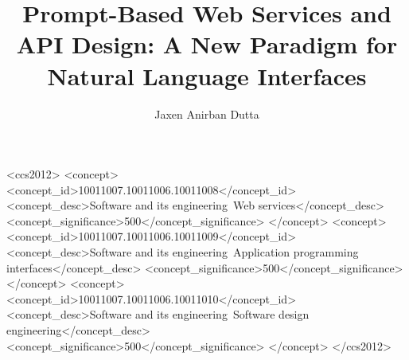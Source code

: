 \documentclass[sigplan,screen]{acmart}
\begin{document}
\title{Prompt-Based Web Services and API Design: A New Paradigm for Natural Language Interfaces}

\author{Jaxen Anirban Dutta}

\renewcommand{\shortauthors}{Dutta}



\begin{CCSXML}
<ccs2012>
 <concept>
  <concept_id>10011007.10011006.10011008</concept_id>
  <concept_desc>Software and its engineering~Web services</concept_desc>
  <concept_significance>500</concept_significance>
 </concept>
 <concept>
  <concept_id>10011007.10011006.10011009</concept_id>
  <concept_desc>Software and its engineering~Application programming interfaces</concept_desc>
  <concept_significance>500</concept_significance>
 </concept>
 <concept>
  <concept_id>10011007.10011006.10011010</concept_id>
  <concept_desc>Software and its engineering~Software design engineering</concept_desc>
  <concept_significance>500</concept_significance>
 </concept>
</ccs2012>
\end{CCSXML}


\end{document}
